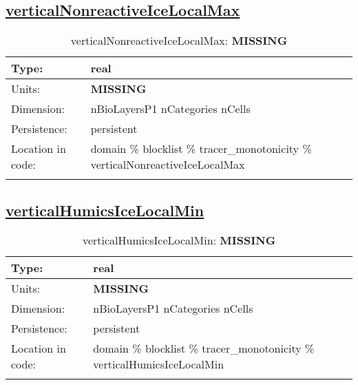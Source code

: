 \subsection[verticalNonreactiveIceLocalMax]{\hyperref[sec:var_tab_tracer_monotonicity]{verticalNonreactiveIceLocalMax}}
\label{subsec:var_sec_tracer_monotonicity_verticalNonreactiveIceLocalMax}
\begin{center}
\begin{longtable}{| p{2.0in} | p{4.0in} |}
        \hline 
        Type: & real \\
        \hline 
        Units: & {\bf \color{red} MISSING} \\
        \hline 
        Dimension: & nBioLayersP1 nCategories nCells \\
        \hline 
        Persistence: & persistent \\
        \hline 
         Location in code: & domain \% blocklist \% tracer\_monotonicity \% verticalNonreactiveIceLocalMax \\
         \hline 
    \caption{verticalNonreactiveIceLocalMax: {\bf \color{red} MISSING}}
\end{longtable}
\end{center}
\subsection[verticalHumicsIceLocalMin]{\hyperref[sec:var_tab_tracer_monotonicity]{verticalHumicsIceLocalMin}}
\label{subsec:var_sec_tracer_monotonicity_verticalHumicsIceLocalMin}
\begin{center}
\begin{longtable}{| p{2.0in} | p{4.0in} |}
        \hline 
        Type: & real \\
        \hline 
        Units: & {\bf \color{red} MISSING} \\
        \hline 
        Dimension: & nBioLayersP1 nCategories nCells \\
        \hline 
        Persistence: & persistent \\
        \hline 
         Location in code: & domain \% blocklist \% tracer\_monotonicity \% verticalHumicsIceLocalMin \\
         \hline 
    \caption{verticalHumicsIceLocalMin: {\bf \color{red} MISSING}}
\end{longtable}
\end{center}
